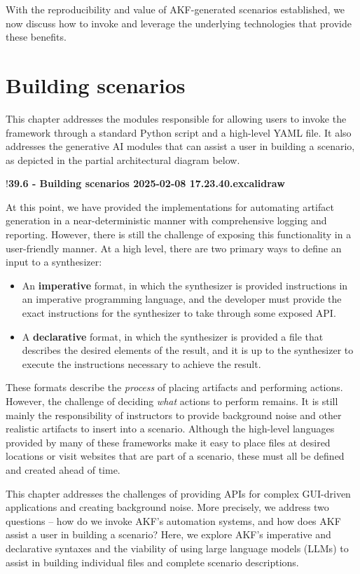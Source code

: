 \documentclass[letterpaper,12pt]{report}
\def\tightlist{}
\begin{document}
With the reproducibility and value of AKF-generated scenarios
established, we now discuss how to invoke and leverage the underlying
technologies that provide these benefits.

\chapter{Building scenarios}\label{chapter-six}

This chapter addresses the modules responsible for allowing users to
invoke the framework through a standard Python script and a high-level
YAML file. It also addresses the generative AI modules that can assist a
user in building a scenario, as depicted in the partial architectural
diagram below.

!\textbf{39.6 - Building scenarios 2025-02-08 17.23.40.excalidraw}

At this point, we have provided the implementations for automating
artifact generation in a near-deterministic manner with comprehensive
logging and reporting. However, there is still the challenge of exposing
this functionality in a user-friendly manner. At a high level, there are
two primary ways to define an input to a synthesizer:

\begin{itemize}
\tightlist
\item
  An \textbf{imperative} format, in which the synthesizer is provided
  instructions in an imperative programming language, and the developer
  must provide the exact instructions for the synthesizer to take
  through some exposed API.
\item
  A \textbf{declarative} format, in which the synthesizer is provided a
  file that describes the desired elements of the result, and it is up
  to the synthesizer to execute the instructions necessary to achieve
  the result.
\end{itemize}

These formats describe the \emph{process} of placing artifacts and
performing actions. However, the challenge of deciding \emph{what}
actions to perform remains. It is still mainly the responsibility of
instructors to provide background noise and other realistic artifacts to
insert into a scenario. Although the high-level languages provided by
many of these frameworks make it easy to place files at desired
locations or visit websites that are part of a scenario, these must all
be defined and created ahead of time.

This chapter addresses the challenges of providing APIs for complex
GUI-driven applications and creating background noise. More precisely,
we address two questions -- how do we invoke AKF's automation systems,
and how does AKF assist a user in building a scenario? Here, we explore
AKF's imperative and declarative syntaxes and the viability of using
large language models (LLMs) to assist in building individual files and
complete scenario descriptions.
\end{document}
